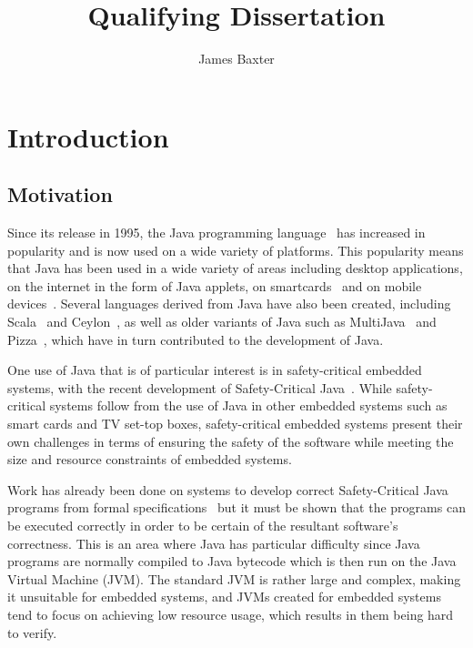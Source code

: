\documentclass[a4paper,12pt]{article}
\title{Qualifying Dissertation}
\author{James Baxter}
\date{}
\begin{document}
\maketitle

\section{Introduction}

\subsection{Motivation}

Since its release in 1995, the Java programming language~\cite{gosling2013} has increased in popularity and is now used on a wide variety of platforms.
This popularity means that Java has been used in a wide variety of areas including desktop applications, on the internet in the form of Java applets, on smartcards~\cite{chen2000} and on mobile devices~\cite{oracle2014}.
Several languages derived from Java have also been created, including Scala~\cite{lausanne2015} and Ceylon~\cite{redhat2015}, as well as older variants of Java such as MultiJava~\cite{clifton2006} and Pizza~\cite{odersky1997}, which have in turn contributed to the development of Java.

One use of Java that is of particular interest is in safety-critical embedded systems, with the recent development of Safety-Critical Java~\cite{locke2013}.
While safety-critical systems follow from the use of Java in other embedded systems such as smart cards and TV set-top boxes, safety-critical embedded systems present their own challenges in terms of ensuring the safety of the software while meeting the size and resource constraints of embedded systems.

Work has already been done on systems to develop correct Safety-Critical Java programs from formal specifications~\cite{cavalcanti2011, cavalcanti2013} but it must be shown that the programs can be executed correctly in order to be certain of the resultant software's correctness.
This is an area where Java has particular difficulty since Java programs are normally compiled to Java bytecode which is then run on the Java Virtual Machine (JVM).
The standard JVM is rather large and complex, making it unsuitable for embedded systems, and JVMs created for embedded systems~\cite{thomm2010,caska2011} tend to focus on achieving low resource usage, which results in them being hard to verify.
\end{document}
